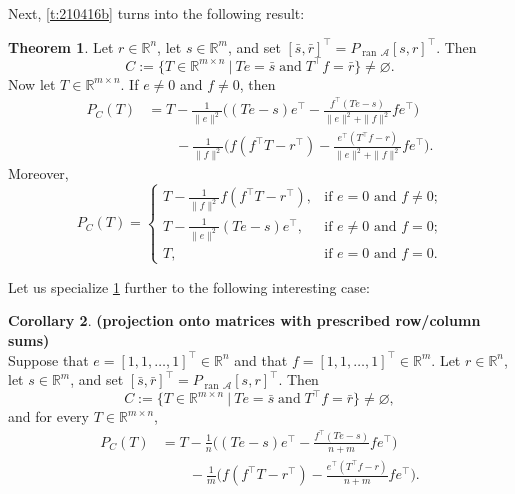 \documentclass[12pt]{article}
\newcommand{\menge}[2]{\big\{{#1}~\big |~{#2}\big\}}
\newcommand{\RR}{\ensuremath{\mathbb R}}
\newcommand{\ran}{\ensuremath{{\operatorname{ran}}\,}}
\theoremstyle{definition}
\newtheorem{theorem}{Theorem}[section]
\newtheorem{corollary}[theorem]{Corollary}
\providecommand{\RR}{\mathbb{R}}
\providecommand{\ran}{\operatorname{ran}}
\providecommand{\ran}{\operatorname{ran}}
\providecommand{\RR}{\mathbb{R}}
\providecommand{\mA}{\mathcal{A}}
\begin{document}
{Next, \cref{t:210416b} turns into the following result:

\begin{theorem}
\label{t:210418c}
Let $r\in\RR^n$, let $s\in\RR^m$, and set 
$[\bar{s},\bar{r}]^\intercal = P_{\ran\mA}[s,r]^\intercal$. 
Then
\begin{equation}
C := \menge{T\in\RR^{m\times n}}{Te=\bar{s}\;\text{and}\;T^\intercal f = \bar{r}}\neq\varnothing.
\end{equation}
Now let $T\in\RR^{m\times n}$.
If $e\neq 0$ and $f\neq 0$, then 
\begin{subequations}
\begin{align}
P_C(T) &= 
T  - \frac{1}{\|e\|^2}
\Big( 
(Te-s)e^\intercal
-\frac{{f^\intercal}(Te-s)}{\|e\|^2 + \|f\|^2}fe^\intercal
\Big)\\[+2mm]
&\qquad
- \frac{1}{\|f\|^2}
\Big( 
f(f^\intercal T-r^\intercal)
-\frac{{e^\intercal}{(T^\intercal f-r)}}{\|e\|^2 + \|f\|^2}
fe^\intercal  \Big).
\end{align}
\end{subequations}
Moreover, 
\begin{equation}
P_C(T) = 
\begin{cases}
T-\displaystyle \frac{1}{\|f\|^2}f(f^\intercal T-r^\intercal), &\text{if $e=0$ and $f\neq 0$;}\\[+3mm]
T-\displaystyle \frac{1}{\|e\|^2}(Te-s) e^\intercal, &\text{if $e\neq 0$ and $f=0$;}\\[+3mm]
T, &\text{if $e=0$ and $f=0$.}
\end{cases}
\end{equation}
\end{theorem}

Let us specialize \cref{t:210418c} further
to the following interesting case:

\begin{corollary}\label{c:rectrowsum}\textbf{(projection onto matrices 
with prescribed row/column sums)}\\
\label{c:210914a}
Suppose that $e=[1,1,\ldots,1]^\intercal\in\RR^n$ and that
$f=[1,1,\ldots,1]^\intercal\in\RR^m$. 
Let $r\in\RR^n$, let $s\in\RR^m$, and set 
$[\bar{s},\bar{r}]^\intercal = P_{\ran\mA}[s,r]^\intercal$. 
Then
\begin{equation}
C := \menge{T\in\RR^{m\times n}}{Te=\bar{s}\;\text{and}\;T^\intercal f = \bar{r}}\neq\varnothing, 
\end{equation}
and for every $T\in\RR^{m\times n}$, 
\begin{subequations}
\label{e:210914b}
\begin{align}
P_C(T) &= 
T  - \frac{1}{n}
\Big( 
(Te-s)e^\intercal
-\frac{{f^\intercal}(Te-s)}{n+m}fe^\intercal
\Big)\\[+2mm]
&\qquad
- \frac{1}{m}
\Big( 
f(f^\intercal T-r^\intercal)
-\frac{{e^\intercal}{(T^\intercal f-r)}}{n + m}
fe^\intercal  \Big).
\end{align}
\end{subequations}
\end{corollary}


}
\end{document}
